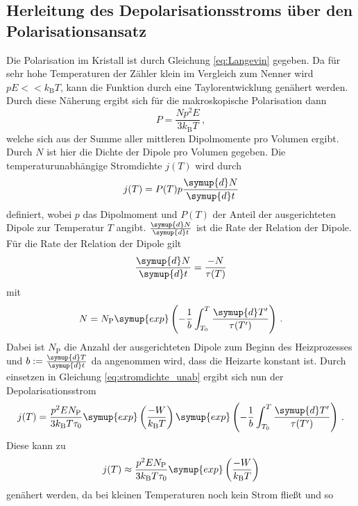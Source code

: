 \subsection{Herleitung des Depolarisationsstroms über den Polarisationsansatz}
\label{sec:polarisationsansatz}
Die Polarisation im Kristall ist durch Gleichung \eqref{eq:Langevin} gegeben.
Da für sehr hohe Temperaturen der Zähler klein im Vergleich zum Nenner wird $pE << k_\text{B} T$, kann die Funktion durch eine Taylorentwicklung genähert werden.
Durch diese Näherung ergibt sich für die makroskopische Polarisation dann
\begin{equation}
    P = \frac{Np^2E}{3 k_\text{B}T} \, ,
    \label{eq:langevin2}
\end{equation}
welche sich aus der Summe aller mittleren Dipolmomente pro Volumen ergibt.
Durch $N$ ist hier die Dichte der Dipole pro Volumen gegeben.
Die temperaturunabhängige Stromdichte $j(T)$ wird durch
\begin{equation}
    j(T) = P(T)p \frac{\symup{d}N}{\symup{d}t}
    \label{eq:stromdichte_unab}
\end{equation}
definiert, wobei $p$ das Dipolmoment und $P(T)$ der Anteil der ausgerichteten Dipole zur Temperatur $T$ angibt.
$\frac{\symup{d}N}{\symup{d}t}$ ist die Rate der Relation der Dipole.
Für die Rate der Relation der Dipole gilt
\begin{equation}
    \frac{\symup{d}N}{\symup{d}t} = \frac{-N}{\tau(T)}
\end{equation}
mit 
\begin{equation}
    N = N_\text{P} \symup{exp}\left (-\frac{1}{b} \int_{T_0}^{T} \frac{\symup{d}T'}{\tau(T')} \right ) \, .
\end{equation}
Dabei ist $N_\text{P}$ die Anzahl der ausgerichteten Dipole zum Beginn des Heizprozesses und $b := \frac{\symup{d}T}{\symup{d}t}$ da angenommen wird, dass die Heizarte konstant ist.
Durch einsetzen in Gleichung \eqref{eq:stromdichte_unab} ergibt sich nun der Depolarisationsstrom
\begin{equation}
    j(T) = \frac{p^2EN_\text{P}}{3 k_\text{B}T\tau_0} \symup{exp}\left (\frac{-W}{k_\text{B}T} \right ) \symup{exp} \left (-\frac{1}{b} \int_{T_0}^{T} \frac{\symup{d}T'}{\tau(T')}\right ) \, .
\end{equation}
Diese kann zu
\begin{equation}
    j(T) \approx  \frac{p^2EN_\text{P}}{3 k_\text{B}T\tau_0} \symup{exp} \left ( \frac{-W}{k_\text{B}T} \right )
\end{equation}
genähert werden, da bei kleinen Temperaturen noch kein Strom fließt und so
